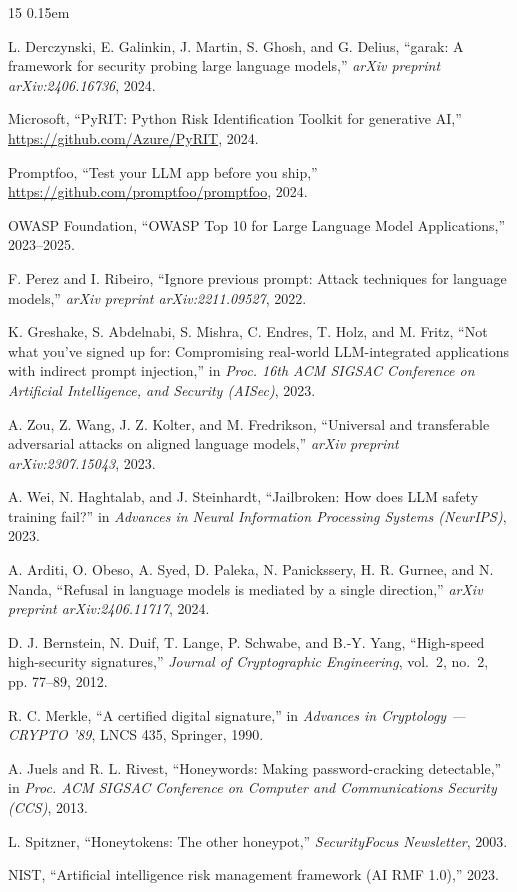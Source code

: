\documentclass[11pt,a4paper]{article}
\begin{document}
\begin{thebibliography}{15}
\itemsep 0.15em

L. Derczynski, E. Galinkin, J. Martin, S. Ghosh, and G. Delius,
``garak: A framework for security probing large language models,''
\emph{arXiv preprint arXiv:2406.16736}, 2024.

Microsoft, ``PyRIT: Python Risk Identification Toolkit for generative
AI,'' \url{https://github.com/Azure/PyRIT}, 2024.

Promptfoo, ``Test your LLM app before you ship,''
\url{https://github.com/promptfoo/promptfoo}, 2024.

OWASP Foundation, ``OWASP Top 10 for Large Language Model Applications,''
2023--2025.

F. Perez and I. Ribeiro, ``Ignore previous prompt: Attack techniques for
language models,'' \emph{arXiv preprint arXiv:2211.09527}, 2022.

K. Greshake, S. Abdelnabi, S. Mishra, C. Endres, T. Holz, and M. Fritz,
``Not what you've signed up for: Compromising real-world LLM-integrated
applications with indirect prompt injection,'' in \emph{Proc. 16th ACM
SIGSAC Conference on Artificial Intelligence, and Security (AISec)},
2023.

A. Zou, Z. Wang, J. Z. Kolter, and M. Fredrikson, ``Universal and
transferable adversarial attacks on aligned language models,''
\emph{arXiv preprint arXiv:2307.15043}, 2023.

A. Wei, N. Haghtalab, and J. Steinhardt, ``Jailbroken: How does LLM
safety training fail?'' in \emph{Advances in Neural Information
Processing Systems (NeurIPS)}, 2023.

A. Arditi, O. Obeso, A. Syed, D. Paleka, N. Panickssery, H. R. Gurnee,
and N. Nanda, ``Refusal in language models is mediated by a single
direction,'' \emph{arXiv preprint arXiv:2406.11717}, 2024.

D. J. Bernstein, N. Duif, T. Lange, P. Schwabe, and B.-Y. Yang,
``High-speed high-security signatures,'' \emph{Journal of Cryptographic
Engineering}, vol.~2, no.~2, pp. 77--89, 2012.

R. C. Merkle, ``A certified digital signature,'' in \emph{Advances in
Cryptology --- CRYPTO '89}, LNCS 435, Springer, 1990.

A. Juels and R. L. Rivest, ``Honeywords: Making password-cracking
detectable,'' in \emph{Proc. ACM SIGSAC Conference on Computer and
Communications Security (CCS)}, 2013.

L. Spitzner, ``Honeytokens: The other honeypot,'' \emph{SecurityFocus
Newsletter}, 2003.

NIST, ``Artificial intelligence risk management framework (AI RMF 1.0),'' 2023.

\end{thebibliography}
\end{document}
